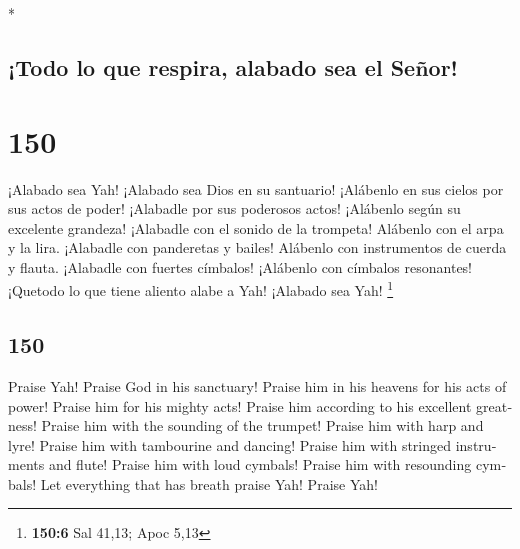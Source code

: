 \begin{paracol}{2}
\begin{otherlanguage}{english}
\end{otherlanguage}

\switchcolumn[0]*

\hypertarget{todo-lo-que-respira-alabado-sea-el-seuxf1or}{%
\subsection{¡Todo lo que respira, alabado sea el
Señor!}\label{todo-lo-que-respira-alabado-sea-el-seuxf1or}}

\hypertarget{section-298}{%
\section{150}\label{section-298}}

 ¡Alabado sea Yah! ¡Alabado sea Dios en su santuario!
¡Alábenlo en sus cielos por sus actos de poder!  ¡Alabadle
por sus poderosos actos! ¡Alábenlo según su excelente grandeza!
 ¡Alabadle con el sonido de la trompeta! Alábenlo con el
arpa y la lira.  ¡Alabadle con panderetas y bailes!
Alábenlo con instrumentos de cuerda y flauta.  ¡Alabadle
con fuertes címbalos! ¡Alábenlo con címbalos resonantes! 
¡Quetodo lo que tiene aliento alabe a Yah! ¡Alabado sea Yah! \footnote{\textbf{150:6}
  Sal 41,13; Apoc 5,13} \switchcolumn
\begin{otherlanguage}{english}

\hypertarget{section-299}{%
\section{150}\label{section-299}}

 Praise Yah! Praise God in his sanctuary! Praise him in
his heavens for his acts of power!  Praise him for his
mighty acts! Praise him according to his excellent greatness!
 Praise him with the sounding of the trumpet! Praise him
with harp and lyre!  Praise him with tambourine and
dancing! Praise him with stringed instruments and flute! 
Praise him with loud cymbals! Praise him with resounding cymbals!
 Let everything that has breath praise Yah! Praise Yah!
\end{otherlanguage} \end{paracol}
